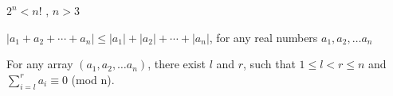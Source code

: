 \begin{lemma}
  $2^n < n!$ , $n > 3$
\end{lemma}

\begin{lemma}
  $|a_1+a_2+\cdots+a_n| \leq |a_1| + |a_2| + \cdots + |a_n|$, for any real numbers $a_1, a_2, \dots a_n$
\end{lemma}

\begin{lemma}
  For any array $(a_1, a_2, \dots a_n)$, there exist $l$ and $r$, such that $1 \leq l < r \leq n$ and \\ $\displaystyle \sum_{i=l}^{r} a_i \equiv 0$ (mod n).
\end{lemma}
